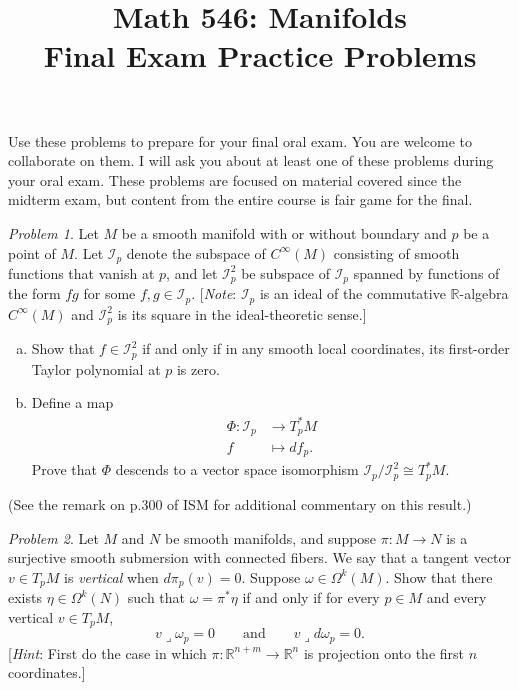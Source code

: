 \documentclass[11pt,twoside]{amsart}
\title{Math 546: Manifolds\\ Final Exam Practice Problems}
\theoremstyle{plain}
\theoremstyle{remark}
\newtheorem{prob}{Problem}
\theoremstyle{definition}
\theoremstyle{definition}
\newcommand{\RR}{\mathbb{R}}
\newcommand{\contract}{\mathbin{\lrcorner}}
\begin{document}
\maketitle

\noindent Use these problems to prepare for your final oral exam. You are welcome to collaborate on them. I will ask you about at least one of these problems during your oral exam. These problems are focused on material covered since the midterm exam, but content from the entire course is fair game for the final.

\begin{prob}
Let $M$ be a smooth manifold with or without boundary and $p$ be a point of $M$. Let $\mathcal I_p$ denote the subspace of $C^\infty(M)$ consisting of smooth functions that vanish at $p$, and let $\mathcal I_p^2$ be subspace of $\mathcal I_p$ spanned by functions of the form $fg$ for some $f,g\in \mathcal I_p$. [\emph{Note}: $\mathcal I_p$ is an ideal of the commutative $\RR$-algebra $C^\infty(M)$ and $\mathcal I_p^2$ is its square in the ideal-theoretic sense.]
\begin{enumerate}[(a)]
\item Show that $f\in \mathcal I_p^2$ if and only if in any smooth local coordinates, its first-order Taylor polynomial at $p$ is zero.
\item Define a map
\[
\begin{aligned}
  \Phi\colon \mathcal I_p&\longrightarrow T_p^*M\\
  f&\longmapsto df_p.
\end{aligned}
\]
Prove that $\Phi$ descends to a vector space isomorphism $\mathcal I_p/\mathcal I_p^2\cong T_p^*M$.
\end{enumerate}
(See the remark on p.300 of ISM for additional commentary on this result.)
\end{prob}

\begin{prob}
Let $M$ and $N$ be smooth manifolds, and suppose $\pi\colon M\to N$ is a surjective smooth submersion with connected fibers. We say that a tangent vector $v\in T_pM$ is \emph{vertical} when $d\pi_p(v)=0$. Suppose $\omega\in \Omega^k(M)$. Show that there exists $\eta\in \Omega^k(N)$ such that $\omega = \pi^*\eta$ if and only if for every $p\in M$ and every vertical $v\in T_pM$,
\[
  v\contract \omega_p=0 \qquad\text{and}\qquad v\contract d\omega_p=0.
\]
[\emph{Hint}: First do the case in which $\pi \colon \RR^{n+m}\to \RR^n$ is projection onto the first $n$ coordinates.]
\end{prob}
\end{document}
